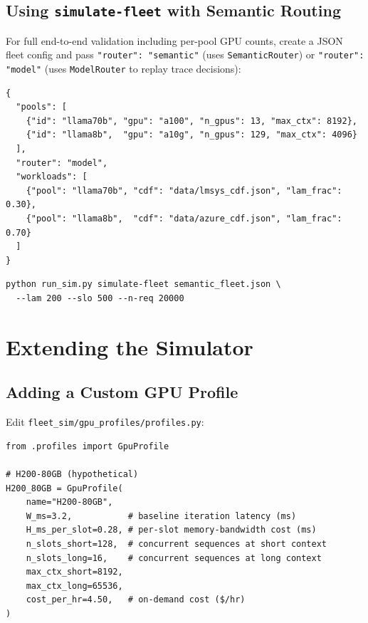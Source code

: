 \documentclass[11pt,a4paper]{article}
\begin{document}
\subsection{Using \texttt{simulate-fleet} with Semantic Routing}

For full end-to-end validation including per-pool GPU counts, create a JSON
fleet config and pass \texttt{"router": "semantic"} (uses
\texttt{SemanticRouter}) or \texttt{"router": "model"} (uses
\texttt{ModelRouter} to replay trace decisions):

\begin{lstlisting}[style=python]
{
  "pools": [
    {"id": "llama70b", "gpu": "a100", "n_gpus": 13, "max_ctx": 8192},
    {"id": "llama8b",  "gpu": "a10g", "n_gpus": 129, "max_ctx": 4096}
  ],
  "router": "model",
  "workloads": [
    {"pool": "llama70b", "cdf": "data/lmsys_cdf.json", "lam_frac": 0.30},
    {"pool": "llama8b",  "cdf": "data/azure_cdf.json", "lam_frac": 0.70}
  ]
}
\end{lstlisting}

\begin{lstlisting}[style=shell]
python run_sim.py simulate-fleet semantic_fleet.json \
  --lam 200 --slo 500 --n-req 20000
\end{lstlisting}

\section{Extending the Simulator}
\label{sec:extend}

\subsection{Adding a Custom GPU Profile}

Edit \texttt{fleet\_sim/gpu\_profiles/profiles.py}:

\begin{lstlisting}[style=python]
from .profiles import GpuProfile

# H200-80GB (hypothetical)
H200_80GB = GpuProfile(
    name="H200-80GB",
    W_ms=3.2,           # baseline iteration latency (ms)
    H_ms_per_slot=0.28, # per-slot memory-bandwidth cost (ms)
    n_slots_short=128,  # concurrent sequences at short context
    n_slots_long=16,    # concurrent sequences at long context
    max_ctx_short=8192,
    max_ctx_long=65536,
    cost_per_hr=4.50,   # on-demand cost ($/hr)
)
\end{lstlisting}
\end{document}
